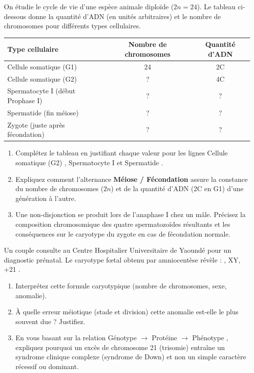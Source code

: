 \documentclass[11pt]{article}
\begin{document}
\begin{exercice}
On étudie le cycle de vie d'une espèce animale diploïde ($2n = 24$). Le tableau ci-dessous donne la quantité d'ADN (en unités arbitraires) et le nombre de chromosomes pour différents types cellulaires.
\begin{center}
\begin{tabular}{|l|c|c|}
\hline
\textbf{Type cellulaire} & \textbf{Nombre de chromosomes} & \textbf{Quantité d'ADN} \\ \hline
Cellule somatique (G1) & 24 & 2C \\ \hline
Cellule somatique (G2) & ? & 4C \\ \hline
Spermatocyte I (début Prophase I) & ? & ? \\ \hline
Spermatide (fin méiose) & ? & ? \\ \hline
Zygote (juste après fécondation) & ? & ? \\ \hline
\end{tabular}
\end{center}
\begin{enumerate}
    \item Complétez le tableau en justifiant chaque valeur pour les lignes \og Cellule somatique (G2) \fg{}, \og Spermatocyte I \fg{} et \og Spermatide \fg{}.
    \item Expliquez comment l'alternance \textbf{Méiose / Fécondation} assure la constance du nombre de chromosomes ($2n$) et de la quantité d'ADN (2C en G1) d'une génération à l'autre.
    \item Une non-disjonction se produit lors de l'anaphase I chez un mâle. Précisez la composition chromosomique des quatre spermatozoïdes résultants et les conséquences sur le caryotype du zygote en cas de fécondation normale.
\end{enumerate}
\end{exercice}

\begin{exercice}
Un couple consulte au Centre Hospitalier Universitaire de Yaoundé pour un diagnostic prénatal. Le caryotype fœtal obtenu par amniocentèse révèle : , XY, +21 \fg{}.
\begin{enumerate}
    \item Interprétez cette formule caryotypique (nombre de chromosomes, sexe, anomalie).
    \item À quelle erreur méiotique (stade et division) cette anomalie est-elle le plus souvent due ? Justifiez.
    \item En vous basant sur la relation \og Génotype $\rightarrow$ Protéine $\rightarrow$ Phénotype \fg{}, expliquez pourquoi un excès de chromosome 21 (trisomie) entraîne un syndrome clinique complexe (syndrome de Down) et non un simple caractère récessif ou dominant.
\end{enumerate}
\end{exercice}
\end{document}
